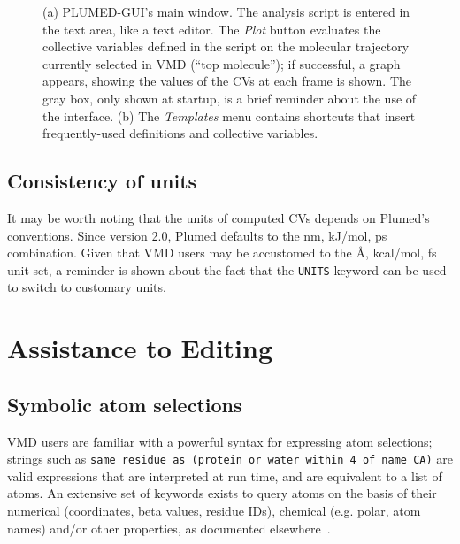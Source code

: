 \documentclass[preprint,12pt]{elsarticle}
\begin{document}
\begin{figure}
  \caption{(a) PLUMED-GUI's main window.  The analysis script is
    entered in the text area, like a text editor. The \emph{Plot}
    button evaluates the collective variables defined in the script on
    the molecular trajectory currently selected in VMD (``top
    molecule''); if successful, a graph appears, showing the values of
    the CVs at each frame is shown. The gray box, only shown at
    startup, is a brief reminder about the use of the interface. (b)
    The \emph{Templates} menu contains shortcuts that insert
    frequently-used definitions and collective variables. }
\end{figure}




\subsection{Consistency of units}

It may be worth noting that the units of computed CVs  depends on
Plumed's conventions.  Since version 2.0, Plumed defaults to the nm,
kJ/mol, ps combination. Given that VMD users may be accustomed to the
\AA, kcal/mol, fs unit set, a reminder is shown about the fact that
the \texttt{UNITS} keyword can be used to  switch to customary
units.



\section{Assistance to Editing}


\subsection{Symbolic atom selections}\label{sec:symb-atom-select}

VMD users are familiar with a powerful syntax for expressing atom
selections; strings such as \texttt{same residue as (protein or water
  within 4 of name CA)} are valid expressions that are interpreted at
run time, and are equivalent to a list of atoms.  An extensive set of
keywords exists to query atoms on the basis of their numerical
(coordinates, beta values, residue IDs), chemical (e.g. polar, atom
names) and/or other properties, as documented
elsewhere~\cite{Humphrey_Dalke_Schulten_1996}.
\end{document}
